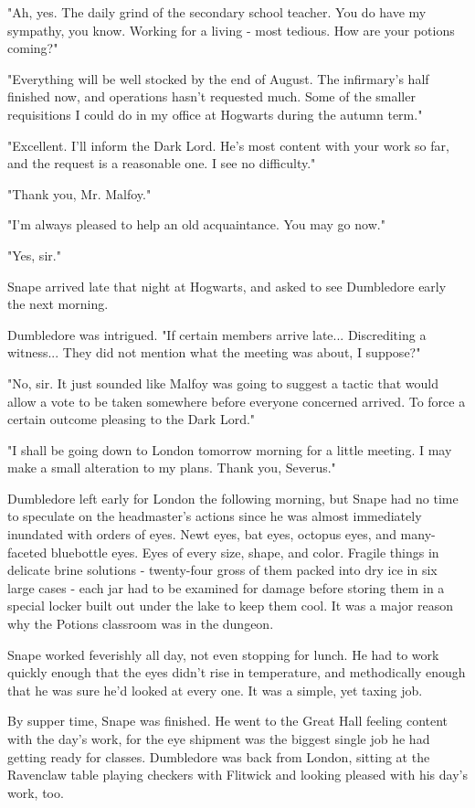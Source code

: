 \documentclass[a4paper,11pt]{article}
\begin{document}
"Ah, yes. The daily grind of the secondary school teacher. You do have my sympathy, you know. Working for a living - most tedious. How are your potions coming?"

"Everything will be well stocked by the end of August. The infirmary's half finished now, and operations hasn't requested much. Some of the smaller requisitions I could do in my office at Hogwarts during the autumn term."

"Excellent. I'll inform the Dark Lord. He's most content with your work so far, and the request is a reasonable one. I see no difficulty."

"Thank you, Mr. Malfoy."

"I'm always pleased to help an old acquaintance. You may go now."

"Yes, sir."

Snape arrived late that night at Hogwarts, and asked to see Dumbledore early the next morning.

Dumbledore was intrigued. "If certain members arrive late... Discrediting a witness... They did not mention what the meeting was about, I suppose?"

"No, sir. It just sounded like Malfoy was going to suggest a tactic that would allow a vote to be taken somewhere before everyone concerned arrived. To force a certain outcome pleasing to the Dark Lord."

"I shall be going down to London tomorrow morning for a little meeting. I may make a small alteration to my plans. Thank you, Severus."

Dumbledore left early for London the following morning, but Snape had no time to speculate on the headmaster's actions since he was almost immediately inundated with orders of eyes. Newt eyes, bat eyes, octopus eyes, and many-faceted bluebottle eyes. Eyes of every size, shape, and color. Fragile things in delicate brine solutions - twenty-four gross of them packed into dry ice in six large cases - each jar had to be examined for damage before storing them in a special locker built out under the lake to keep them cool. It was a major reason why the Potions classroom was in the dungeon.

Snape worked feverishly all day, not even stopping for lunch. He had to work quickly enough that the eyes didn't rise in temperature, and methodically enough that he was sure he'd looked at every one. It was a simple, yet taxing job.

By supper time, Snape was finished. He went to the Great Hall feeling content with the day's work, for the eye shipment was the biggest single job he had getting ready for classes. Dumbledore was back from London, sitting at the Ravenclaw table playing checkers with Flitwick and looking pleased with his day's work, too.
\end{document}
